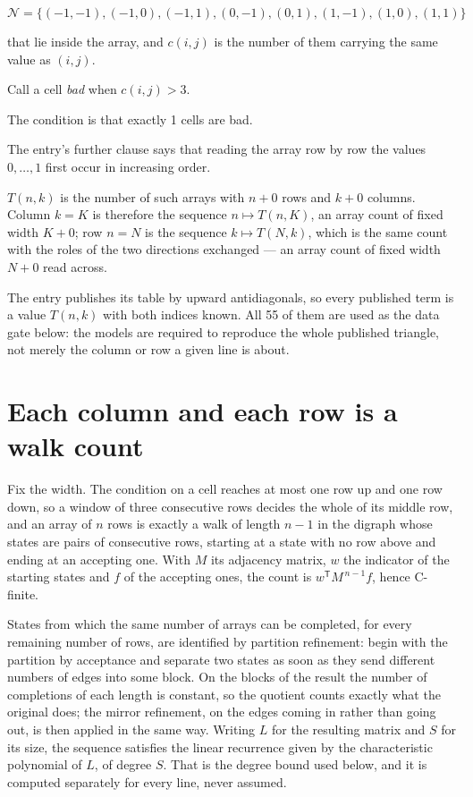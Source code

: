 \documentclass[11pt]{article}
\theoremstyle{definition}
\begin{document}
\[\mathcal{N} = \{(-1,-1), (-1,0), (-1,1), (0,-1), (0,1), (1,-1), (1,0), (1,1)\}\]

that lie inside the array, and $c(i,j)$ is the number of them carrying the same value as $(i,j)$.

Call a cell {\itshape bad} when $c(i,j) > 3$.

The condition is that exactly 1 cells are bad.

The entry's further clause says that reading the array row by row the values $0,\dots,1$ first occur in increasing order.

$T(n,k)$ is the number of such arrays with $n + 0$ rows and $k + 0$ columns. Column $k = K$ is therefore the sequence $n \mapsto T(n,K)$, an array count of fixed width $K + 0$; row $n = N$ is the sequence $k \mapsto T(N,k)$, which is the same count with the roles of the two directions exchanged --- an array count of fixed width $N + 0$ read across.

The entry publishes its table by upward antidiagonals, so every published term is a value $T(n,k)$ with both indices known. All 55 of them are used as the data gate below: the models are required to reproduce the whole published triangle, not merely the column or row a given line is about.

\section{Each column and each row is a walk count}

Fix the width. The condition on a cell reaches at most one row up and one row down, so a window of three consecutive rows decides the whole of its middle row, and an array of $n$ rows is exactly a walk of length $n-1$ in the digraph whose states are pairs of consecutive rows, starting at a state with no row above and ending at an accepting one. With $M$ its adjacency matrix, $w$ the indicator of the starting states and $f$ of the accepting ones, the count is $w^{\mathsf T}M^{\,n-1}f$, hence C-finite.

States from which the same number of arrays can be completed, for every remaining number of rows, are identified by partition refinement: begin with the partition by acceptance and separate two states as soon as they send different numbers of edges into some block. On the blocks of the result the number of completions of each length is constant, so the quotient counts exactly what the original does; the mirror refinement, on the edges coming in rather than going out, is then applied in the same way. Writing $L$ for the resulting matrix and $S$ for its size, the sequence satisfies the linear recurrence given by the characteristic polynomial of $L$, of degree $S$. That is the degree bound used below, and it is computed separately for every line, never assumed.
\end{document}
